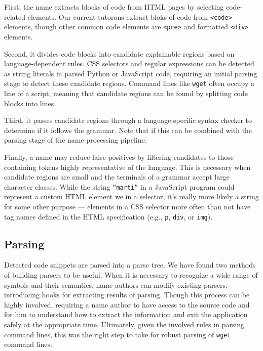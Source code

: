 First, the \gls{name} extracts blocks of code from HTML pages by selecting code-related elements.
Our current tutorons extract bloks of code from \texttt{<code>} elements, though other common code elements are \texttt{<pre>} and formatted \texttt{<div>} elements.

Second, it divides code blocks into candidate explainable regions based on language-dependent rules.
CSS selectors and regular expressions can be detected as string literals in parsed Python or JavaScript code, requiring an initial parsing stage to detect these candidate regions.
Command lines like \texttt{wget} often occupy a line of a script, meaning that candidate regions can be found by splitting code blocks into lines.

Third, it passes candidate regions through a language-specific syntax checker to determine if it follows the grammar.
Note that if this can be combined with the parsing stage of the \gls{name} processing pipeline.

Finally, a \gls{name} may reduce false positives by filtering candidates to those containing tokens highly representative of the language.
This is necessary when candidate regions are small and the terminals of a grammar accept large character classes.
While the string \texttt{``marti''} in a JavaScript program could represent a custom HTML element we in a selector, it's really more likely a string for some other purpose --- elements in a CSS selector more often than not have tag names defined in the HTML specification (e.g., \texttt{p}, \texttt{div}, or \texttt{img}).

\subsection{Parsing}

Detected code snippets are parsed into a parse tree.
We have found two methods of building parsers to be useful.
When it is necessary to recognize a wide range of symbols and their semantics, \gls{name} authors can modify existing parsers, introducing hooks for extracting results of parsing.
Though this process can be highly involved, requiring a \gls{name} author to have access to the source code and for him to understand how to extract the information and exit the application safely at the appropriate time.
Ultimately, given the involved rules in parsing command lines, this was the right step to take for robust parsing of \texttt{wget} command lines.

